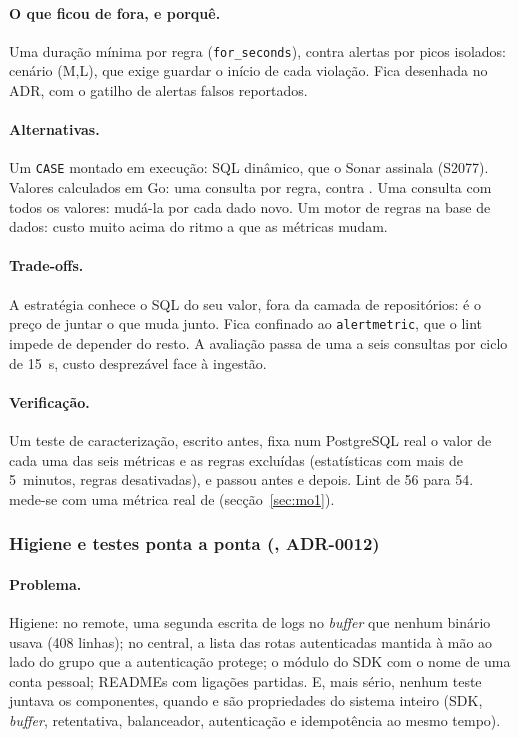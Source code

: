 \paragraph{O que ficou de fora, e porquê.}
Uma duração mínima por regra (\texttt{for\_seconds}), contra alertas por picos isolados: cenário (M,L), que exige
guardar o início de cada violação. Fica desenhada no ADR, com o gatilho de alertas falsos reportados.

\paragraph{Alternativas.}
Um \texttt{CASE} montado em execução: SQL dinâmico, que o Sonar assinala (S2077). Valores calculados em Go: uma
consulta por regra, contra . Uma consulta com todos os valores: mudá-la por cada dado novo. Um motor de
regras na base de dados: custo muito acima do ritmo a que as métricas mudam.

\paragraph{Trade-offs.}
A estratégia conhece o SQL do seu valor, fora da camada de repositórios: é o preço de juntar o que muda junto. Fica
confinado ao \texttt{alertmetric}, que o lint impede de depender do resto. A avaliação passa de uma a seis
consultas por ciclo de 15~s, custo desprezável face à ingestão.

\paragraph{Verificação.}
Um teste de caracterização, escrito antes, fixa num PostgreSQL real o valor de cada uma das seis métricas e as
regras excluídas (estatísticas com mais de 5~minutos, regras desativadas), e passou antes e depois. Lint de 56 para
54.  mede-se com uma métrica real de  (secção~\ref{sec:mo1}).

\subsubsection{Higiene e testes ponta a ponta (, ADR-0012)}
\label{sec:d15}

\paragraph{Problema.}
Higiene: no remote, uma segunda escrita de logs no \emph{buffer} que nenhum binário usava (408 linhas); no central,
a lista das rotas autenticadas mantida à mão ao lado do grupo que a autenticação protege; o módulo do SDK com o nome
de uma conta pessoal; READMEs com ligações partidas. E, mais sério, nenhum teste juntava os componentes, quando
 e  são propriedades do sistema inteiro (SDK, \emph{buffer}, retentativa, balanceador,
autenticação e idempotência ao mesmo tempo).

